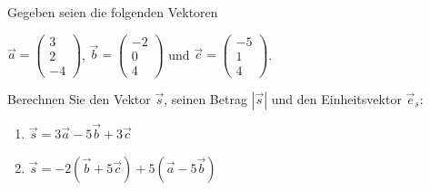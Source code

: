 \begin{ExerciseBlock}
Gegeben seien die folgenden Vektoren
\begin{center}
$\vec{a}=\left(\begin{array}{c} 3 \\ 2 \\ -4 \end{array}\right)$, 
$\vec{b}=\left(\begin{array}{c} -2 \\ 0 \\ 4\end{array}\right)$ und
${\vec{c}}=\left(\begin{array}{c} -5 \\ 1 \\ 4 \end{array}\right)$. 
\end{center}

Berechnen Sie den Vektor $\vec{s}$, seinen Betrag $|\vec{s}|$ und den Einheitsvektor $\vec{e}_s$:
\begin{enumerate}[label=\alph*)]
	\item $\vec{s}=3\vec{a}-5\vec{b}+3\vec{c}$
	\item $\vec{s}=-2\left(\vec{b}+5\vec{c}\right)+5\left(\vec{a}-5\vec{b}\right)$
\end{enumerate} 

\end{ExerciseBlock}
